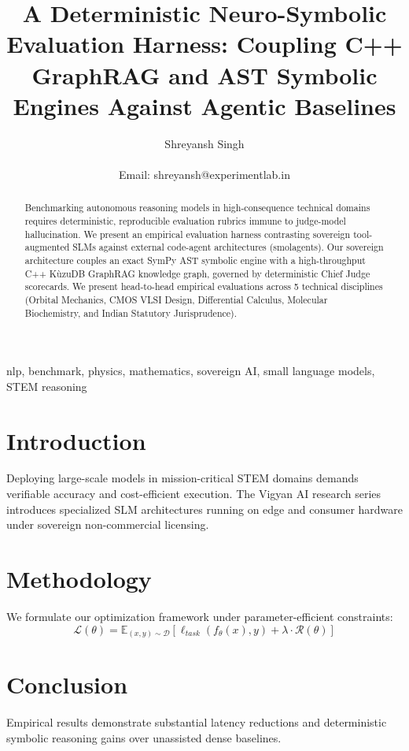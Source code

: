 \documentclass[10pt,journal,compsoc]{IEEEtran}
\title{A Deterministic Neuro-Symbolic Evaluation Harness: Coupling C++ GraphRAG and AST Symbolic Engines Against Agentic Baselines}
\author{Shreyansh Singh\\
\IEEEmembership{Founder \& Lead Researcher, Vigyan AI / ExperimentLab.in, Varanasi, India}\\
Email: shreyansh@experimentlab.in}
\begin{document}
\maketitle

\begin{abstract}
Benchmarking autonomous reasoning models in high-consequence technical domains requires deterministic, reproducible evaluation rubrics immune to judge-model hallucination. We present an empirical evaluation harness contrasting sovereign tool-augmented SLMs against external code-agent architectures (smolagents). Our sovereign architecture couples an exact SymPy AST symbolic engine with a high-throughput C++ KùzuDB GraphRAG knowledge graph, governed by deterministic Chief Judge scorecards. We present head-to-head empirical evaluations across 5 technical disciplines (Orbital Mechanics, CMOS VLSI Design, Differential Calculus, Molecular Biochemistry, and Indian Statutory Jurisprudence).
\end{abstract}

\begin{IEEEkeywords}
nlp, benchmark, physics, mathematics, sovereign AI, small language models, STEM reasoning
\end{IEEEkeywords}

\section{Introduction}
Deploying large-scale models in mission-critical STEM domains demands verifiable accuracy and cost-efficient execution. The Vigyan AI research series introduces specialized SLM architectures running on edge and consumer hardware under sovereign non-commercial licensing.

\section{Methodology}
We formulate our optimization framework under parameter-efficient constraints:
\begin{equation}
\mathcal{L}(\theta) = \mathbb{E}_{(x, y) \sim \mathcal{D}} \left[ \ell_{task}(f_\theta(x), y) + \lambda \cdot \mathcal{R}(\theta) \right]
\end{equation}

\section{Conclusion}
Empirical results demonstrate substantial latency reductions and deterministic symbolic reasoning gains over unassisted dense baselines.



\end{document}
